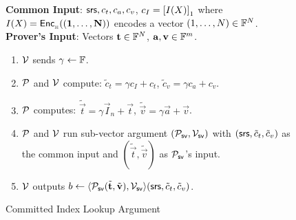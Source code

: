 \begin{figure}[htbp]
\begin{mdframed}
{
    {\bf Common Input}: $\mathsf{srs},c_t, c_a, c_v$, $c_I=\left[{I(X)}\right]_1$ where $I(X)=\mathsf{Enc}_{{}_{\mathbb{H}}}(\mathbf{(1,\ldots,N)})$ encodes a vector $(1,\ldots,N)\in \mathbb{F}^N$. \\
    {\bf Prover's Input}: Vectors $\mathbf{t}\in \mathbb{F}^N$, $\mathbf{a},\mathbf{v}\in\mathbb{F}^m$.
    \begin{enumerate}[leftmargin=1em, label=\arabic*.]
    \item $\mathcal{V}$ sends $\gamma\gets \mathbb{F}$.
    \item $\mathcal{P}$ and $\mathcal{V}$ compute: $\tilde{c}_t=\gamma c_I+c_t$, $\tilde{c}_v=\gamma c_a + c_v$.
    \item $\mathcal{P}$ computes: $\tilde{\vec{t}}=\gamma\vec{I}_n + \vec{t}$, $\tilde{\vec{v}}=\gamma\vec{a} + \vec{v}$.
    \item $\mathcal{P}$ and $\mathcal{V}$ run sub-vector argument $(\mathcal{P}_{\mathsf{sv}},\mathcal{V}_{\mathsf{sv}})$ with
    $(\mathsf{srs},\tilde{c}_t,\tilde{c}_v)$ as the common input and $(\tilde{\vec{t}},\tilde{\vec{v}})$ as $\mathcal{P}_{\mathsf{sv}}$'s input.
    \item $\mathcal{V}$ outputs
    $b\gets \langle {\ensuremath{\mathcal{P}}_{\mathsf{sv}}}({\tilde{\mathbf{t}},\tilde{\mathbf{v}}}), {\mathcal{V}_{\mathsf{sv}}}\rangle({\mathsf{srs},\tilde{c}_t,\tilde{c}_v})$.
    \end{enumerate}
}
\end{mdframed}
\caption{Committed Index Lookup Argument}
\label{fig:committed-index-lookup}
\end{figure}

